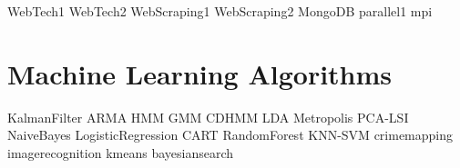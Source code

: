 \documentclass[opener-c,labs,yellow,nociteref]{HJnewsiambook}
\begin{document}
{WebTech1}
{WebTech2}
{WebScraping1}
{WebScraping2}
{MongoDB}
{parallel1}
{mpi}

\part{Machine Learning Algorithms} %
{KalmanFilter}
{ARMA}
{HMM}
{GMM}
{CDHMM}
{LDA}
{Metropolis}
{PCA-LSI}
{NaiveBayes}
{LogisticRegression}
{CART}
{RandomForest}
{KNN-SVM}
{crimemapping}
{imagerecognition}
{kmeans}
{bayesiansearch}
\end{document}
